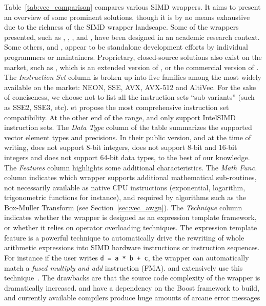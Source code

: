 Table~\ref{tab:vec_comparison} compares various SIMD wrappers. It aims to
present an overview of some prominent solutions, though it is by no means
exhaustive due to the richness of the SIMD wrapper landscape. Some of the
wrappers presented, such as \MIPP, \Vc, \BoostSIMD, \VCL and \TSIMD, have been
designed in an academic research context. Some others, \simdpp and \xsimd,
appear to be standalone development efforts by individual programmers or
maintainers. Proprietary, closed-source solutions also exist on the market, such
as \bSIMD, which is an extended version of \BoostSIMD, or the commercial version
of \VCL. The \textit{Instruction Set} column is broken up into five families
among the most widely available on the market: NEON, SSE, AVX, AVX-512 and
AltiVec. For the sake of conciseness, we choose not to list all the instruction
sets ``sub-variants'' (such as SSE2, SSE3, etc). \simdpp et \bSIMD propose the
most comprehensive instruction set compatibility. At the other end of the range,
\xsimd and \BoostSIMD only support Intel\R SIMD instruction sets. The
\textit{Data Type} column of the table summarizes the supported vector element
types and precisions. In their public version, and at the time of writing, \Vc
does not support 8-bit integers, \xsimd does not support 8-bit and 16-bit
integers and \TSIMD does not support 64-bit data types, to the best of our
knowledge. The \textit{Features} column highlights some additional
characteristics. The \textit{Math Func.}~ column indicates which wrapper
supports additional mathematical sub-routines, not necessarily available as
native CPU instructions (exponential, logarithm, trigonometric functions for
instance), and required by algorithms such as the Box-Muller Transform (see
Section~\ref{sec:vec_awgn}). The \textit{\Cxx Technique} column indicates
whether the wrapper is designed as an expression template framework, or whether
it relies on operator overloading techniques. The expression template feature is
a powerful technique to automatically drive the rewriting of whole arithmetic
expressions into SIMD hardware instructions or instruction sequences. For
instance if the user writes \verb|d = a * b + c|, the wrapper can automatically
match a \emph{fused multiply and add} instruction (FMA). \BoostSIMD and \bSIMD
extensively use this technique~\cite{Esterie2012,Esterie2012a}. The drawbacks
are that the source code complexity of the wrapper is dramatically increased.
\BoostSIMD and \bSIMD have a dependency on the Boost framework to build, and
currently available \Cxx compilers produce huge amounts of arcane error messages
